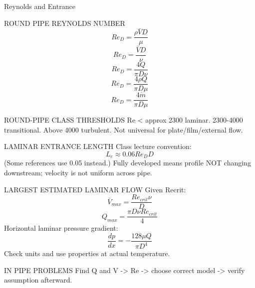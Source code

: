Reynolds and Entrance

ROUND PIPE REYNOLDS NUMBER
$$Re_D=\frac{\rho\bar VD}{\mu}$$
$$Re_D=\frac{\bar VD}{\nu}$$
$$Re_D=\frac{4Q}{\pi D\nu}$$
$$Re_D=\frac{4\rho Q}{\pi D\mu}$$
$$Re_D=\frac{4\dot m}{\pi D\mu}$$

ROUND-PIPE CLASS THRESHOLDS
Re < approx 2300 laminar.
2300-4000 transitional.
Above 4000 turbulent.
Not universal for plate/film/external flow.

LAMINAR ENTRANCE LENGTH
Class lecture convention:
$$L_e\approx 0.06Re_D D$$
(Some references use 0.05 instead.)
Fully developed means profile NOT changing downstream; velocity is not uniform across pipe.

LARGEST ESTIMATED LAMINAR FLOW
Given Recrit:
$$\bar V_{max}=\frac{Re_{crit}\nu}{D}$$
$$Q_{max}=\frac{\pi D\nu Re_{crit}}{4}$$
Horizontal laminar pressure gradient:
$$\frac{dp}{dx}=-\frac{128\mu Q}{\pi D^4}$$
Check units and use properties at actual temperature.

IN PIPE PROBLEMS
Find Q and V -> Re -> choose correct model -> verify assumption afterward.
